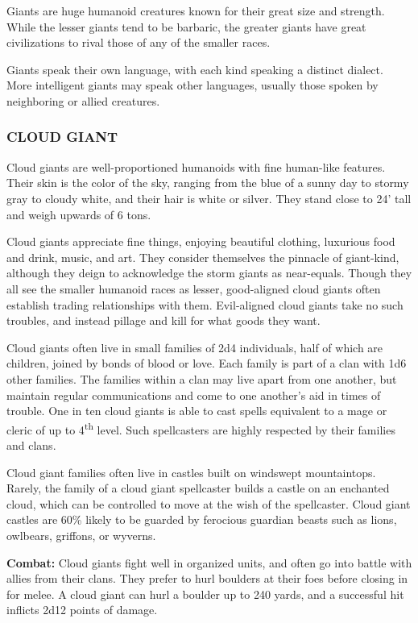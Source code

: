 \begin{multicols}{2}

Giants are huge humanoid creatures known for their great size and strength. While the lesser giants tend to be barbaric, the greater giants have great civilizations to rival those of any of the smaller races.

Giants speak their own language, with each kind speaking a distinct dialect. More intelligent giants may speak other languages, usually those spoken by neighboring or allied creatures.

\subsubsection{CLOUD GIANT}

Cloud giants are well-proportioned humanoids with fine human-like features. Their skin is the color of the sky, ranging from the blue of a sunny day to stormy gray to cloudy white, and their hair is white or silver. They stand close to 24' tall and weigh upwards of 6 tons.

Cloud giants appreciate fine things, enjoying beautiful clothing, luxurious food and drink, music, and art.  They consider themselves the pinnacle of giant-kind, although they deign to acknowledge the storm giants as near-equals. Though they all see the smaller humanoid races as lesser, good-aligned cloud giants often establish trading relationships with them. Evil-aligned cloud giants take no such troubles, and instead pillage and kill for what goods they want.

Cloud giants often live in small families of 2d4 individuals, half of which are children, joined by bonds of blood or love. Each family is part of a clan with 1d6 other families. The families within a clan may live apart from one another, but maintain regular communications and come to one another's aid in times of trouble. One in ten cloud giants is able to cast spells equivalent to a mage or cleric of up to 4\textsuperscript{th} level. Such spellcasters are highly respected by their families and clans.

Cloud giant families often live in castles built on windswept mountaintops. Rarely, the family of a cloud giant spellcaster builds a castle on an enchanted cloud, which can be controlled to move at the wish of the spellcaster. Cloud giant castles are 60\% likely to be guarded by ferocious guardian beasts such as lions, owlbears, griffons, or wyverns.

\textbf{Combat:} Cloud giants fight well in organized units, and often go into battle with allies from their clans. They prefer to hurl boulders at their foes before closing in for melee. A cloud giant can hurl a boulder up to 240 yards, and a successful hit inflicts 2d12 points of damage.


\end{multicols}
